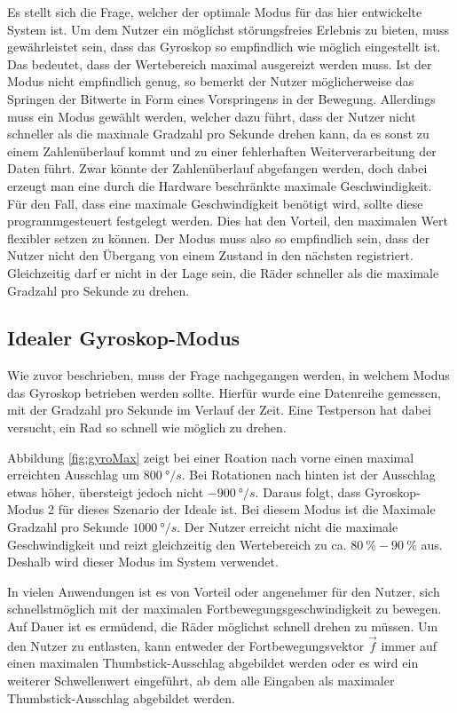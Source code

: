 Es stellt sich die Frage, welcher der optimale Modus für das hier entwickelte System ist.
Um dem Nutzer ein möglichst störungsfreies Erlebnis zu bieten, muss gewährleistet sein, dass das Gyroskop so empfindlich wie möglich eingestellt ist.
Das bedeutet, dass der Wertebereich maximal ausgereizt werden muss.
Ist der Modus nicht empfindlich genug, so bemerkt der Nutzer möglicherweise das Springen der Bitwerte in Form eines Vorspringens in der Bewegung.
Allerdings muss ein Modus gewählt werden, welcher dazu führt, dass der Nutzer nicht schneller als die maximale Gradzahl pro Sekunde drehen kann, da es sonst zu einem Zahlenüberlauf kommt und zu einer fehlerhaften Weiterverarbeitung der Daten führt.
Zwar könnte der Zahlenüberlauf abgefangen werden, doch dabei erzeugt man eine durch die Hardware beschränkte maximale Geschwindigkeit.
Für den Fall, dass eine maximale Geschwindigkeit benötigt wird, sollte diese programmgesteuert festgelegt werden.
Dies hat den Vorteil, den maximalen Wert flexibler setzen zu können.
Der Modus muss also so empfindlich sein, dass der Nutzer nicht den Übergang von einem Zustand in den nächsten registriert.
Gleichzeitig darf er nicht in der Lage sein, die Räder schneller als die maximale Gradzahl pro Sekunde zu drehen.

\subsection{Idealer Gyroskop-Modus}
Wie zuvor beschrieben, muss der Frage nachgegangen werden, in welchem Modus das Gyroskop betrieben werden sollte.
Hierfür wurde eine Datenreihe gemessen, mit der Gradzahl pro Sekunde im Verlauf der Zeit.
Eine Testperson hat dabei versucht, ein Rad so schnell wie möglich zu drehen.



Abbildung \ref{fig:gyroMax} zeigt bei einer Roation nach vorne einen maximal erreichten Ausschlag um $800\ \si{\degree}/s$.
Bei Rotationen nach hinten ist der Ausschlag etwas höher, übersteigt jedoch nicht $-900\ \si{\degree}/s$.
Daraus folgt, dass Gyroskop-Modus 2 für dieses Szenario der Ideale ist.
Bei diesem Modus ist die Maximale Gradzahl pro Sekunde $1000\ \si{\degree}/s$.
Der Nutzer erreicht nicht die maximale Geschwindigkeit und reizt gleichzeitig den Wertebereich zu ca. $80\ \%-90\ \%$ aus.
Deshalb wird dieser Modus im System verwendet.

In vielen Anwendungen ist es von Vorteil oder angenehmer für den Nutzer, sich schnellstmöglich mit der maximalen Fortbewegungsgeschwindigkeit zu bewegen.
Auf Dauer ist es ermüdend, die Räder möglichst schnell drehen zu müssen.
Um den Nutzer zu entlasten, kann entweder der Fortbewegungsvektor $\vec{f}$ immer auf einen maximalen Thumbstick-Ausschlag abgebildet werden oder es wird ein weiterer Schwellenwert eingeführt, ab dem alle Eingaben als maximaler Thumbstick-Ausschlag abgebildet werden.

